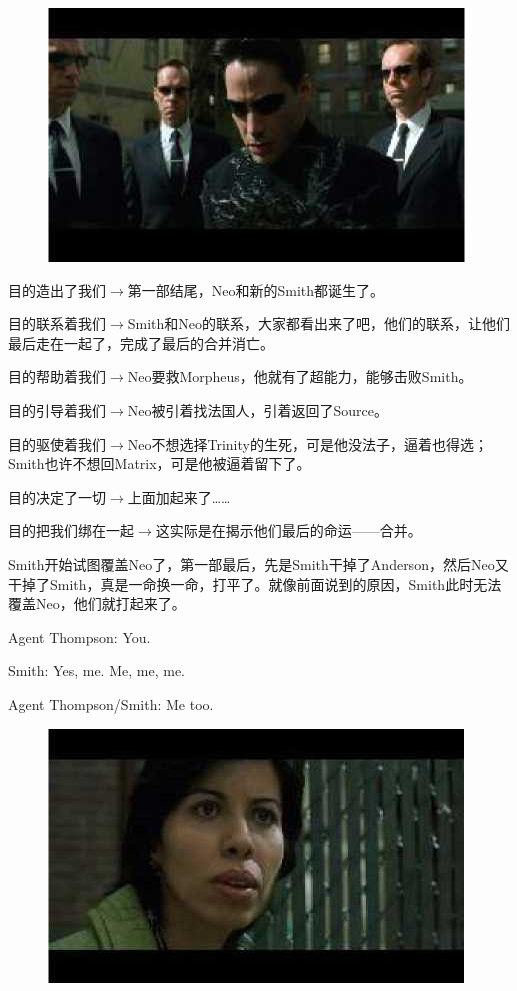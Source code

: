 \documentclass[UTF8]{ctexart}
\newenvironment{myquote}{\color{green} \setlength{\leftskip}{6em} \setlength{\rightskip}{4em} \setlength{\parindent}{-2em}}{\par}
\begin{document}
\begin{figure}[htb]
\centering
\includegraphics[width=0.5\linewidth]{fig/read_reloaded-73}
\end{figure}

目的造出了我们$\rightarrow$第一部结尾，Neo和新的Smith都诞生了。

目的联系着我们$\rightarrow$Smith和Neo的联系，大家都看出来了吧，他们的联系，让他们最后走在一起了，完成了最后的合并消亡。

目的帮助着我们$\rightarrow$Neo要救Morpheus，他就有了超能力，能够击败Smith。

目的引导着我们$\rightarrow$Neo被引着找法国人，引着返回了Source。

目的驱使着我们$\rightarrow$Neo不想选择Trinity的生死，可是他没法子，逼着也得选；Smith也许不想回Matrix，可是他被逼着留下了。

目的决定了一切$\rightarrow$上面加起来了……

目的把我们绑在一起$\rightarrow$这实际是在揭示他们最后的命运——合并。

Smith开始试图覆盖Neo了，第一部最后，先是Smith干掉了Anderson，然后Neo又干掉了Smith，真是一命换一命，打平了。就像前面说到的原因，Smith此时无法覆盖Neo，他们就打起来了。

\begin{myquote}
Agent Thompson: You.

Smith: Yes, me. Me, me, me.

Agent Thompson/Smith: Me too.
\end{myquote}

\begin{figure}[htb]
\centering
\includegraphics[width=0.5\linewidth]{fig/read_reloaded-75}
\end{figure}
\end{document}
